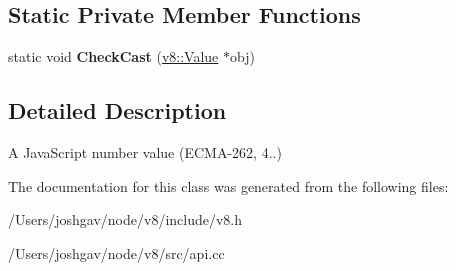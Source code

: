 \subsection*{Static Private Member Functions}
\begin{DoxyCompactItemize}
\item 
static void {\bfseries Check\+Cast} (\hyperlink{classv8_1_1_value}{v8\+::\+Value} $\ast$obj)\hypertarget{classv8_1_1_number_a096fddabb902f1796d6d3397330fceea}{}\label{classv8_1_1_number_a096fddabb902f1796d6d3397330fceea}

\end{DoxyCompactItemize}


\subsection{Detailed Description}
A Java\+Script number value (E\+C\+M\+A-\/262, 4..) 

The documentation for this class was generated from the following files\+:\begin{DoxyCompactItemize}
\item 
/\+Users/joshgav/node/v8/include/v8.\+h\item 
/\+Users/joshgav/node/v8/src/api.\+cc\end{DoxyCompactItemize}
